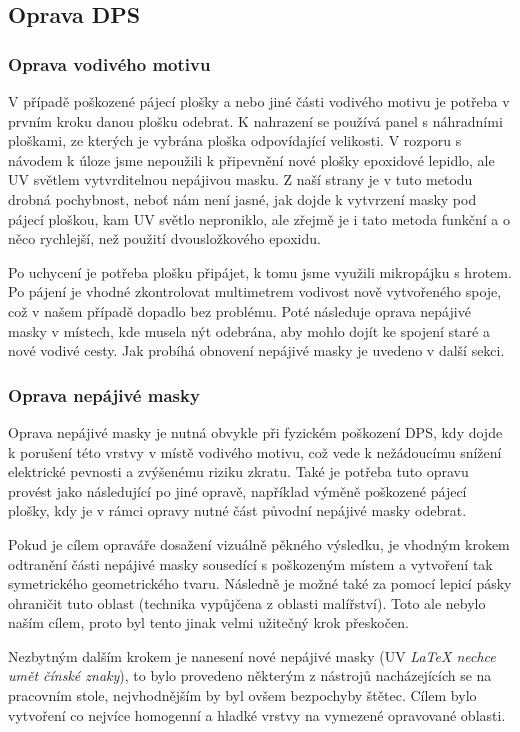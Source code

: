 \subsection{Oprava DPS}
    \subsubsection{Oprava vodivého motivu}
        V případě poškozené pájecí plošky a nebo jiné části vodivého motivu je potřeba v prvním kroku danou plošku odebrat. K nahrazení se používá panel s náhradními ploškami, ze kterých je vybrána ploška odpovídající velikosti. V rozporu s návodem k úloze \cite{zadani} jsme nepoužili k připevnění nové plošky epoxidové lepidlo, ale UV světlem vytvrditelnou nepájivou masku. Z naší strany je v tuto metodu drobná pochybnost, neboť nám není jasné, jak dojde k vytvrzení masky pod pájecí ploškou, kam UV světlo neproniklo, ale zřejmě je i tato metoda funkční a o něco rychlejší, než použití dvousložkového epoxidu.

        Po uchycení je potřeba plošku připájet, k tomu jsme využili mikropájku s hrotem. Po pájení je vhodné zkontrolovat multimetrem vodivost nově vytvořeného spoje, což v našem případě dopadlo bez problému. Poté následuje oprava nepájivé masky v místech, kde musela nýt odebrána, aby mohlo dojít ke spojení staré a nové vodivé cesty. Jak probíhá obnovení nepájivé masky je uvedeno v další sekci. 

    \subsubsection{Oprava nepájivé masky}
        Oprava nepájivé masky je nutná obvykle při fyzickém poškození DPS, kdy dojde k porušení této vrstvy v místě vodivého motivu, což vede k nežádoucímu snížení elektrické pevnosti a zvýšenému riziku zkratu. Také je potřeba tuto opravu provést jako následující po jiné opravě, například výměně poškozené pájecí plošky, kdy je v rámci opravy nutné část původní nepájivé masky odebrat.  

        Pokud je cílem opraváře dosažení vizuálně pěkného výsledku, je vhodným krokem odtranění části nepájivé masky sousedící s poškozeným místem a vytvoření tak symetrického geometrického tvaru. Následně je možné také za pomocí lepicí pásky ohraničit tuto oblast (technika vypůjčena z oblasti malířství). Toto ale nebylo naším cílem, proto byl tento jinak velmi užitečný krok přeskočen.

        Nezbytným dalším krokem je nanesení nové nepájivé masky (UV \textit{LaTeX nechce umět čínské znaky}), to bylo provedeno některým z nástrojů nacházejících se na pracovním stole, nejvhodnějším by byl ovšem bezpochyby štětec. Cílem bylo vytvoření co nejvíce homogenní a hladké vrstvy na vymezené opravované oblasti. 
       